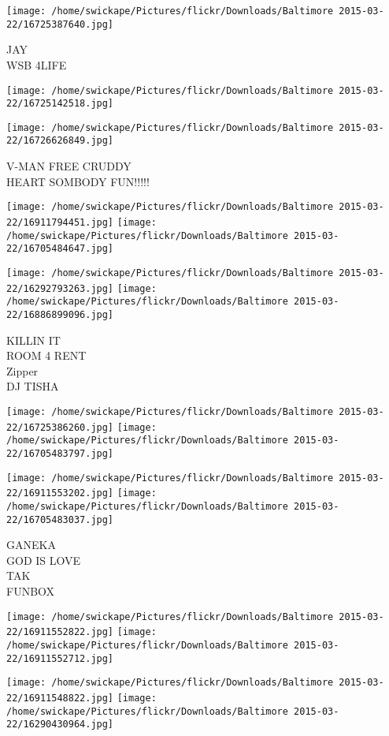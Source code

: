 \documentclass[10pt,letterpaper]{article}
\begin{document}
\vspace{0.25in}
\texttt{[image: /home/swickape/Pictures/flickr/Downloads/Baltimore 2015-03-22/16725387640.jpg]}

JAY\\
WSB 4LIFE
\pagebreak

\texttt{[image: /home/swickape/Pictures/flickr/Downloads/Baltimore 2015-03-22/16725142518.jpg]}

\vspace{0.25in}
\texttt{[image: /home/swickape/Pictures/flickr/Downloads/Baltimore 2015-03-22/16726626849.jpg]}

V{-}MAN FREE CRUDDY\\
HEART SOMBODY FUN!!!!!
\pagebreak

\texttt{[image: /home/swickape/Pictures/flickr/Downloads/Baltimore 2015-03-22/16911794451.jpg]}
\texttt{[image: /home/swickape/Pictures/flickr/Downloads/Baltimore 2015-03-22/16705484647.jpg]}

\texttt{[image: /home/swickape/Pictures/flickr/Downloads/Baltimore 2015-03-22/16292793263.jpg]}
\texttt{[image: /home/swickape/Pictures/flickr/Downloads/Baltimore 2015-03-22/16886899096.jpg]}

KILLIN IT\\
ROOM 4 RENT\\
Zipper\\
DJ TISHA
\pagebreak

\texttt{[image: /home/swickape/Pictures/flickr/Downloads/Baltimore 2015-03-22/16725386260.jpg]}
\texttt{[image: /home/swickape/Pictures/flickr/Downloads/Baltimore 2015-03-22/16705483797.jpg]}

\texttt{[image: /home/swickape/Pictures/flickr/Downloads/Baltimore 2015-03-22/16911553202.jpg]}
\texttt{[image: /home/swickape/Pictures/flickr/Downloads/Baltimore 2015-03-22/16705483037.jpg]}

GANEKA\\
GOD IS LOVE\\
TAK\\
FUNBOX
\pagebreak

\texttt{[image: /home/swickape/Pictures/flickr/Downloads/Baltimore 2015-03-22/16911552822.jpg]}
\texttt{[image: /home/swickape/Pictures/flickr/Downloads/Baltimore 2015-03-22/16911552712.jpg]}

\texttt{[image: /home/swickape/Pictures/flickr/Downloads/Baltimore 2015-03-22/16911548822.jpg]}
\texttt{[image: /home/swickape/Pictures/flickr/Downloads/Baltimore 2015-03-22/16290430964.jpg]}
\end{document}
